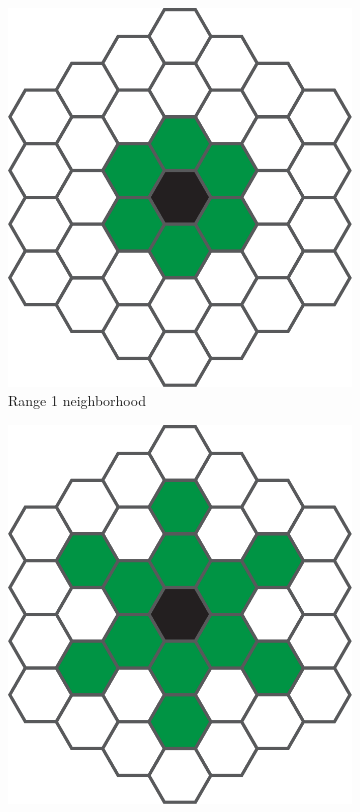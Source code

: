 \begin{figure}[htbp]
  \centering
  \begin{subfigure}[b]{.35\linewidth}
    \centering
    \includegraphics[width=\linewidth]{figures/hexagonal_1}
    \caption{Range 1 neighborhood}
    \label{fig:hexagonal_1}
  \end{subfigure}
  \begin{subfigure}[b]{.35\linewidth}
    \centering
    \includegraphics[width=\linewidth]{figures/hexagonal_2}

\end{subfigure}
\end{figure}
